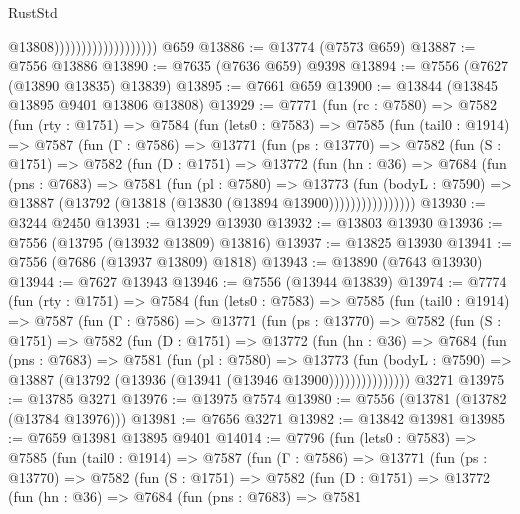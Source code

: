 \begin{lexlean}{RustStd}
\begin{coremodule}
                                          @13808)))))))))))))))))))
    @659
@13886 := @13774 (@7573 @659)
@13887 := @7556 @13886
@13890 := @7635 (@7636 @659) @9398
@13894 := @7556 (@7627 (@13890 @13835) @13839)
@13895 := @7661 @659
@13900 := @13844 (@13845 @13895 @9401 @13806 @13808)
@13929 := @7771
    (fun (rc : @7580) =>
    @7582
      (fun (rty : @1751) =>
      @7584
        (fun (lets0 : @7583) =>
        @7585
          (fun (tail0 : @1914) =>
          @7587
            (fun (Γ : @7586) =>
            @13771
              (fun (ps : @13770) =>
              @7582
                (fun (S : @1751) =>
                @7582
                  (fun (D : @1751) =>
                  @13772
                    (fun (hn : @36) =>
                    @7684
                      (fun (pns : @7683) =>
                      @7581
                        (fun (pl : @7580) =>
                        @13773
                          (fun (bodyL : @7590) =>
                          @13887 (@13792 (@13818 (@13830 (@13894 @13900))))))))))))))))
@13930 := @3244 @2450
@13931 := @13929 @13930
@13932 := @13803 @13930
@13936 := @7556 (@13795 (@13932 @13809) @13816)
@13937 := @13825 @13930
@13941 := @7556 (@7686 (@13937 @13809) @1818)
@13943 := @13890 (@7643 @13930)
@13944 := @7627 @13943
@13946 := @7556 (@13944 @13839)
@13974 := @7774
    (fun (rty : @1751) =>
    @7584
      (fun (lets0 : @7583) =>
      @7585
        (fun (tail0 : @1914) =>
        @7587
          (fun (Γ : @7586) =>
          @13771
            (fun (ps : @13770) =>
            @7582
              (fun (S : @1751) =>
              @7582
                (fun (D : @1751) =>
                @13772
                  (fun (hn : @36) =>
                  @7684
                    (fun (pns : @7683) =>
                    @7581
                      (fun (pl : @7580) =>
                      @13773
                        (fun (bodyL : @7590) =>
                        @13887 (@13792 (@13936 (@13941 (@13946 @13900)))))))))))))))
    @3271
@13975 := @13785 @3271
@13976 := @13975 @7574
@13980 := @7556 (@13781 (@13782 (@13784 @13976)))
@13981 := @7656 @3271
@13982 := @13842 @13981
@13985 := @7659 @13981 @13895 @9401
@14014 := @7796
    (fun (lets0 : @7583) =>
    @7585
      (fun (tail0 : @1914) =>
      @7587
        (fun (Γ : @7586) =>
        @13771
          (fun (ps : @13770) =>
          @7582
            (fun (S : @1751) =>
            @7582
              (fun (D : @1751) =>
              @13772
                (fun (hn : @36) =>
                @7684
                  (fun (pns : @7683) =>
                  @7581

\end{coremodule}
\end{lexlean}
